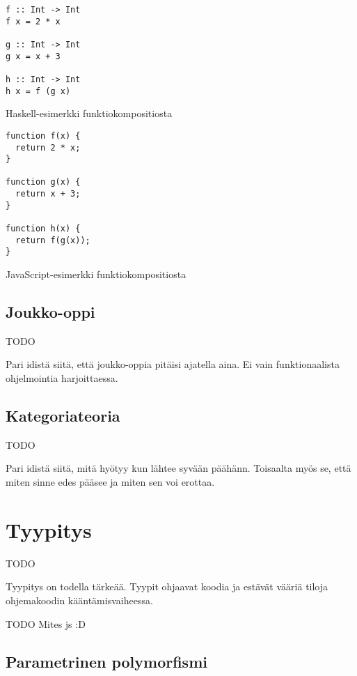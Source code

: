 \begin{code}
  \begin{verbatim}
f :: Int -> Int
f x = 2 * x

g :: Int -> Int
g x = x + 3

h :: Int -> Int
h x = f (g x)
\end{verbatim}
  \caption{Haskell-esimerkki funktiokompositiosta}
  \label{code:haskell_composition}
\end{code}
\bigskip
\begin{code}
  \begin{verbatim}
function f(x) {
  return 2 * x;
}

function g(x) {
  return x + 3;
}

function h(x) {
  return f(g(x));
}
\end{verbatim}
  \caption{JavaScript-esimerkki funktiokompositiosta}
  \label{code:javascript_composition}
\end{code}


\subsection{Joukko-oppi}

TODO

Pari idistä siitä, että joukko-oppia pitäisi ajatella aina. Ei vain funktionaalista ohjelmointia harjoittaessa.

\subsection{Kategoriateoria}

TODO

Pari idistä siitä, mitä hyötyy kun lähtee syvään päähänn. Toisaalta myös se, että miten sinne edes pääsee ja miten sen voi erottaa.

\section{Tyypitys}

TODO

Tyypitys on todella tärkeää. Tyypit ohjaavat koodia ja estävät vääriä tiloja ohjemakoodin kääntämisvaiheessa.

TODO Mites \gls{js} :D



\subsection{Parametrinen polymorfismi}

